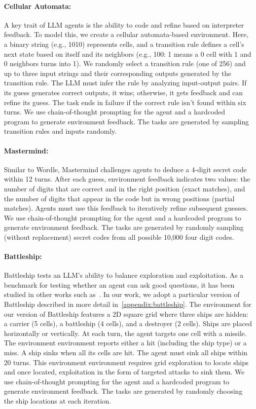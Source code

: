 \documentclass{article}
\theoremstyle{plain}
\theoremstyle{definition}
\theoremstyle{remark}
\begin{document}
\paragraph{Cellular Automata: } A key trait of LLM agents is the ability to code and refine based on interpreter feedback. To model this, we create a cellular automata-based environment. Here, a binary string (e.g., 1010) represents cells, and a transition rule defines a cell’s next state based on itself and its neighbors (e.g., 100: 1 means a 0 cell with 1 and 0 neighbors turns into 1). We randomly select a transition rule (one of 256) and up to three input strings and their corresponding outputs generated by the transition rule. The LLM must infer the rule by analyzing input-output pairs. If its guess generates correct outputs, it wins; otherwise, it gets feedback and can refine its guess. The task ends in failure if the correct rule isn’t found within six turns. We use chain-of-thought prompting for the agent and a hardcoded program to generate environment feedback. The tasks are generated by sampling transition rules and inputs randomly.
\paragraph{Mastermind: } Similar to Wordle, Mastermind challenges agents to deduce a 4-digit secret code within 12 turns. After each guess, environment feedback indicates two values: the number of digits that are correct and in the right position (exact matches), and the number of digits that appear in the code but in wrong positions (partial matches). Agents must use this feedback to iteratively refine subsequent guesses. We use chain-of-thought prompting for the agent and a hardcoded program to generate environment feedback. The tasks are generated by randomly sampling (without replacement) secret codes from all possible 10,000 four digit codes.
\paragraph{Battleship: } Battleship tests an LLM's ability to balance exploration and exploitation. As a benchmark for testing whether an agent can ask good questions, it has been studied in other works such as~\citet{grand2024a,grand2025shootfirstaskquestions,rothe2016battleship,rothe2017questionaskingprogramgeneration,Rothe2018,Rothe2019}. In our work, we adopt a particular version of Battleship described in more detail in~\cref{appendix:battleship}.  The environment for our version of Battleship features a 2D square grid where three ships are hidden: a carrier (5 cells), a battleship (4 cells), and a destroyer (2 cells). Ships are placed horizontally or vertically.
At each turn, the agent targets one cell with a missile. The environment environment reports either a hit (including the ship type) or a miss. A ship sinks when all its cells are hit. The agent must sink all ships within 20 turns. This environment environment requires grid exploration to locate ships and once located, exploitation in the form of targeted attacks to sink them. We use chain-of-thought prompting for the agent and a hardcoded program to generate environment feedback. The tasks are generated by randomly choosing the ship locations at each iteration.
\end{document}

